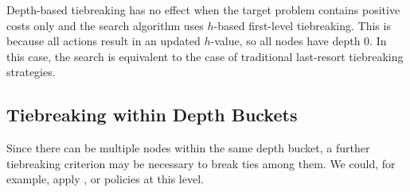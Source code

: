 Depth-based tiebreaking has no effect when the target problem contains
positive costs only and the search algorithm uses $h$-based first-level
tiebreaking.  This is because all actions result in an updated
$h$-value, so all nodes have depth 0. In this case, the search is
equivalent to the case of traditional last-resort tiebreaking strategies.


\subsection{Tiebreaking within Depth Buckets}


Since there can be multiple nodes within the same depth bucket,
a further tiebreaking criterion may be necessary to break ties among them.
We could, for example, apply \lifo, \fifo or \ro policies at this level.





